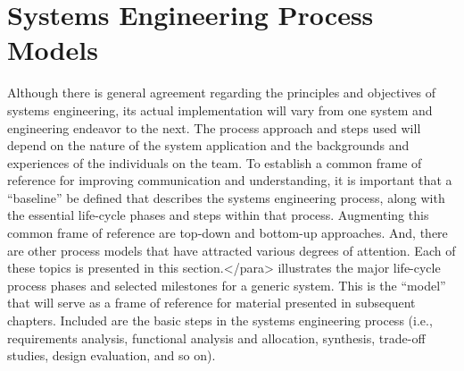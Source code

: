 \section{Systems Engineering Process Models}

Although there is general agreement regarding the principles and objectives of systems engineering, its actual implementation will vary from one system and engineering endeavor to the next. The process approach and steps used will depend on the nature of the system application and the backgrounds and experiences of the individuals on the team.
	To establish a common frame of reference for improving communication and understanding, it is important that a “baseline” be defined that describes the systems engineering process, along with the essential life-cycle phases and steps within that process. Augmenting this common frame of reference are top-down and bottom-up approaches. And, there are other process models that have attracted various degrees of attention. Each of these topics is presented in this section.</para>
 illustrates the major life-cycle process phases and selected milestones for a generic system. This is the “model” that will serve as a frame of reference for material presented in subsequent chapters. Included are the basic steps in the systems engineering process (i.e., requirements analysis, functional analysis and allocation, synthesis, trade-off studies, design evaluation, and so on).

